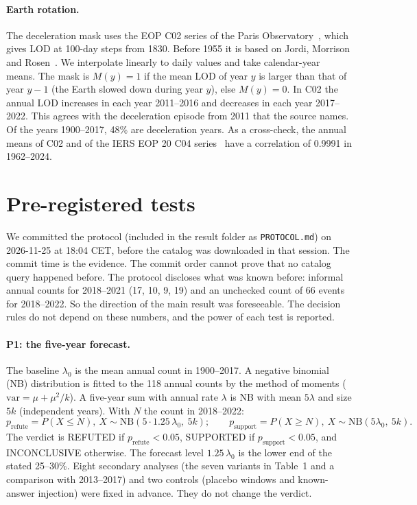 \documentclass[11pt]{article}
\begin{document}
\paragraph{Earth rotation.} The deceleration mask uses the EOP C02 series of the Paris Observatory~\cite{c02}, which gives LOD at 100-day steps from 1830. Before 1955 it is based on Jordi, Morrison and Rosen~\cite{jordi1994}. We interpolate linearly to daily values and take calendar-year means. The mask is $M(y) = 1$ if the mean LOD of year $y$ is larger than that of year $y-1$ (the Earth slowed down during year $y$), else $M(y)=0$. In C02 the annual LOD increases in each year 2011--2016 and decreases in each year 2017--2022. This agrees with the deceleration episode from 2011 that the source names. Of the years 1900--2017, 48\% are deceleration years. As a cross-check, the annual means of C02 and of the IERS EOP 20 C04 series~\cite{c04} have a correlation of 0.9991 in 1962--2024.

\section{Pre-registered tests}
We committed the protocol (included in the result folder as \texttt{PROTOCOL.md}) on 2026-11-25 at 18:04 CET, before the catalog was downloaded in that session. The commit time is the evidence. The commit order cannot prove that no catalog query happened before. The protocol discloses what was known before: informal annual counts for 2018--2021 (17, 10, 9, 19) and an unchecked count of 66 events for 2018--2022. So the direction of the main result was foreseeable. The decision rules do not depend on these numbers, and the power of each test is reported.

\paragraph{P1: the five-year forecast.} The baseline $\lambda_0$ is the mean annual count in 1900--2017. A negative binomial (NB) distribution is fitted to the 118 annual counts by the method of moments ($\mathrm{var} = \mu + \mu^2/k$). A five-year sum with annual rate $\lambda$ is NB with mean $5\lambda$ and size $5k$ (independent years). With $N$ the count in 2018--2022:
\[
p_{\text{refute}} = P(X \le N),\ X \sim \mathrm{NB}(5 \cdot 1.25\,\lambda_0,\ 5k); \qquad
p_{\text{support}} = P(X \ge N),\ X \sim \mathrm{NB}(5\lambda_0,\ 5k).
\]
The verdict is REFUTED if $p_{\text{refute}} < 0.05$, SUPPORTED if $p_{\text{support}} < 0.05$, and INCONCLUSIVE otherwise. The forecast level $1.25\,\lambda_0$ is the lower end of the stated 25--30\%. Eight secondary analyses (the seven variants in Table~1 and a comparison with 2013--2017) and two controls (placebo windows and known-answer injection) were fixed in advance. They do not change the verdict.
\end{document}

